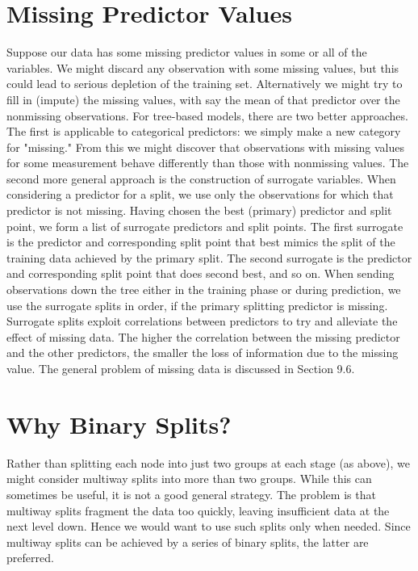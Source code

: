\documentclass[10pt]{article}
\begin{document}
\section*{Missing Predictor Values}
Suppose our data has some missing predictor values in some or all of the variables. We might discard any observation with some missing values, but this could lead to serious depletion of the training set. Alternatively we might try to fill in (impute) the missing values, with say the mean of that predictor over the nonmissing observations. For tree-based models, there are two better approaches. The first is applicable to categorical predictors: we simply make a new category for "missing." From this we might discover that observations with missing values for some measurement behave differently than those with nonmissing values. The second more general approach is the construction of surrogate variables. When considering a predictor for a split, we use only the observations for which that predictor is not missing. Having chosen the best (primary) predictor and split point, we form a list of surrogate predictors and split points. The first surrogate is the predictor and corresponding split point that best mimics the split of the training data achieved by the primary split. The second surrogate is the predictor and corresponding split point that does second best, and so on. When sending observations down the tree either in the training phase or during prediction, we use the surrogate splits in order, if the primary splitting predictor is missing. Surrogate splits exploit correlations between predictors to try and alleviate the effect of missing data. The higher the correlation between the missing predictor and the other predictors, the smaller the loss of information due to the missing value. The general problem of missing data is discussed in Section 9.6.

\section*{Why Binary Splits?}
Rather than splitting each node into just two groups at each stage (as above), we might consider multiway splits into more than two groups. While this can sometimes be useful, it is not a good general strategy. The problem is that multiway splits fragment the data too quickly, leaving insufficient data at the next level down. Hence we would want to use such splits only when needed. Since multiway splits can be achieved by a series of binary splits, the latter are preferred.
\end{document}

